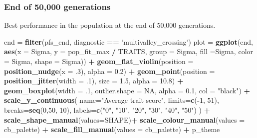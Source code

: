 \documentclass[]{book}
\newenvironment{Shaded}{\begin{snugshade}}{\end{snugshade}}
\newcommand{\DataTypeTok}[1]{\textcolor[rgb]{0.13,0.29,0.53}{#1}}
\newcommand{\DecValTok}[1]{\textcolor[rgb]{0.00,0.00,0.81}{#1}}
\newcommand{\FloatTok}[1]{\textcolor[rgb]{0.00,0.00,0.81}{#1}}
\newcommand{\KeywordTok}[1]{\textcolor[rgb]{0.13,0.29,0.53}{\textbf{#1}}}
\newcommand{\NormalTok}[1]{#1}
\newcommand{\OperatorTok}[1]{\textcolor[rgb]{0.81,0.36,0.00}{\textbf{#1}}}
\newcommand{\OtherTok}[1]{\textcolor[rgb]{0.56,0.35,0.01}{#1}}
\newcommand{\StringTok}[1]{\textcolor[rgb]{0.31,0.60,0.02}{#1}}
\begin{document}
\hypertarget{end-of-50000-generations-30}{%
\subsubsection{End of 50,000 generations}\label{end-of-50000-generations-30}}

Best performance in the population at the end of 50,000 generations.

\begin{Shaded}
\begin{Highlighting}[]
\NormalTok{end =}\StringTok{ }\KeywordTok{filter}\NormalTok{(pfs_end, diagnostic }\OperatorTok{==}\StringTok{ 'multivalley_crossing'}\NormalTok{)}
\NormalTok{plot =}\StringTok{ }\KeywordTok{ggplot}\NormalTok{(end, }\KeywordTok{aes}\NormalTok{(}\DataTypeTok{x =}\NormalTok{ Sigma, }\DataTypeTok{y =}\NormalTok{ pop_fit_max }\OperatorTok{/}\StringTok{ }\NormalTok{TRAITS, }\DataTypeTok{group =}\NormalTok{ Sigma, }\DataTypeTok{fill =}\NormalTok{Sigma, }\DataTypeTok{color =}\NormalTok{ Sigma, }\DataTypeTok{shape =}\NormalTok{ Sigma)) }\OperatorTok{+}
\StringTok{  }\KeywordTok{geom_flat_violin}\NormalTok{(}\DataTypeTok{position =} \KeywordTok{position_nudge}\NormalTok{(}\DataTypeTok{x =} \FloatTok{.3}\NormalTok{), }\DataTypeTok{alpha =} \FloatTok{0.2}\NormalTok{) }\OperatorTok{+}
\StringTok{  }\KeywordTok{geom_point}\NormalTok{(}\DataTypeTok{position =} \KeywordTok{position_jitter}\NormalTok{(}\DataTypeTok{width =} \FloatTok{.1}\NormalTok{), }\DataTypeTok{size =} \FloatTok{1.5}\NormalTok{, }\DataTypeTok{alpha =} \FloatTok{10.8}\NormalTok{) }\OperatorTok{+}
\StringTok{  }\KeywordTok{geom_boxplot}\NormalTok{(}\DataTypeTok{width =} \FloatTok{.1}\NormalTok{, }\DataTypeTok{outlier.shape =} \OtherTok{NA}\NormalTok{, }\DataTypeTok{alpha =} \FloatTok{0.1}\NormalTok{, }\DataTypeTok{col =} \StringTok{"black"}\NormalTok{) }\OperatorTok{+}
\StringTok{  }\KeywordTok{scale_y_continuous}\NormalTok{(}
    \DataTypeTok{name=}\StringTok{"Average trait score"}\NormalTok{,}
    \DataTypeTok{limits=}\KeywordTok{c}\NormalTok{(}\OperatorTok{-}\DecValTok{1}\NormalTok{, }\DecValTok{51}\NormalTok{),}
    \DataTypeTok{breaks=}\KeywordTok{seq}\NormalTok{(}\DecValTok{0}\NormalTok{,}\DecValTok{50}\NormalTok{, }\DecValTok{10}\NormalTok{),}
    \DataTypeTok{labels=}\KeywordTok{c}\NormalTok{(}\StringTok{"0"}\NormalTok{, }\StringTok{"10"}\NormalTok{, }\StringTok{"20"}\NormalTok{, }\StringTok{"30"}\NormalTok{, }\StringTok{"40"}\NormalTok{, }\StringTok{"50"}\NormalTok{)}
\NormalTok{  ) }\OperatorTok{+}
\StringTok{  }\KeywordTok{scale_shape_manual}\NormalTok{(}\DataTypeTok{values=}\NormalTok{SHAPE)}\OperatorTok{+}
\StringTok{  }\KeywordTok{scale_colour_manual}\NormalTok{(}\DataTypeTok{values =}\NormalTok{ cb_palette) }\OperatorTok{+}
\StringTok{  }\KeywordTok{scale_fill_manual}\NormalTok{(}\DataTypeTok{values =}\NormalTok{ cb_palette) }\OperatorTok{+}
\StringTok{  }\NormalTok{p_theme}


\end{Highlighting}
\end{Shaded}
\end{document}
